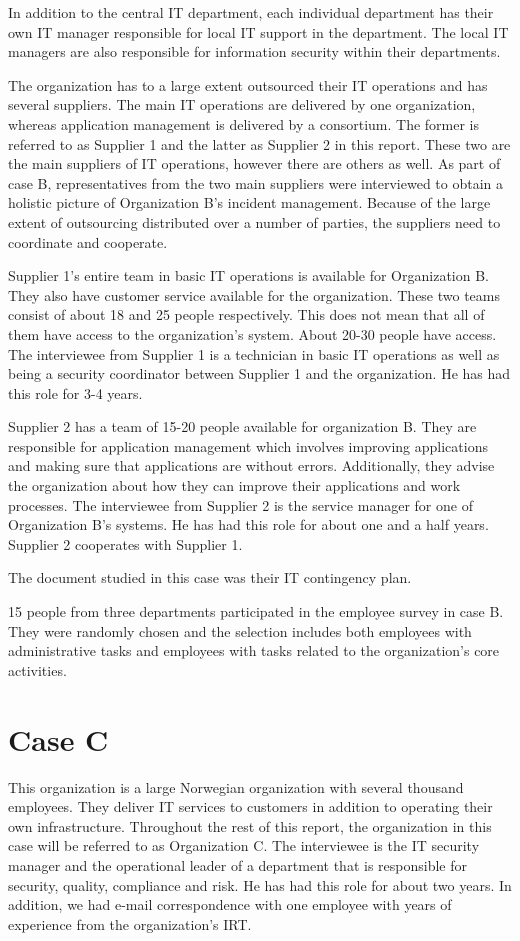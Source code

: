 In addition to the central IT department, %
each individual department has their own IT manager responsible for local IT support in the department. The local IT managers are also responsible for information security within their departments.

The organization has to a large extent outsourced their IT operations and has several suppliers. The main IT operations are delivered by one organization, whereas application management is delivered by a consortium. The former is referred to as Supplier 1 and the latter as Supplier 2 in this report. These two are the main suppliers of IT operations, however there are others as well. As part of case B, representatives from the two main suppliers were interviewed to obtain a holistic picture of Organization B's incident management. Because of the large extent of outsourcing distributed over a number of parties, the suppliers need to coordinate and cooperate. 

Supplier 1's entire team in basic IT operations is available for Organization B. They also have customer service available for the organization. These two teams consist of about 18 and 25 people respectively. This does not mean that all of them have access to the organization's system. About 20-30 people have access. The interviewee from Supplier 1 is a technician in basic IT operations as well as being a security coordinator between Supplier 1 and the organization. He has had this role for 3-4 years.

Supplier 2 has a team of 15-20 people available for organization B. They are responsible for application management which involves improving applications and making sure that applications are without errors. Additionally, they advise the organization about how they can improve their applications and work processes. The interviewee from Supplier 2 is the service manager for one of Organization B's systems. He has had this role for about one and a half years. Supplier 2 cooperates with Supplier 1.

The document studied in this case was their IT contingency plan.

15 people from three departments participated in the employee survey in case B. They were randomly chosen and the selection includes both employees with administrative tasks and employees with tasks related to the organization's core activities.

\section{Case C}
This organization is a large Norwegian organization with several thousand employees. They deliver IT services to customers in addition to operating their own infrastructure. Throughout the rest of this report, the organization in this case will be referred to as Organization C. The interviewee is the IT security manager  and the operational leader of a department that is responsible for security, quality, compliance and risk. He has had this role for about two years. In addition, we had e-mail correspondence with one employee with years of experience from the organization's IRT.

